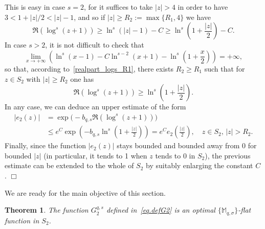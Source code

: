 \documentclass[11pt,a4paper]{article}
\theoremstyle{plain}
\newtheorem{theo}{Theorem}[section]
\theoremstyle{definition}
\newenvironment{proof1}{\medskip\par\noindent{\bf Proof.}}{\hfill $\Box$
\medskip\par}
\def\Ms{{\mathbb{M}}_{q,\sigma}}
\begin{document}
\begin{proof1}
This is easy in case $s=2$, for it suffices to take $|z|>4$ in order to have $3<1+|z|/2<|z|-1$, and so if $|z|\ge R_2:=\max\{R_1,4\}$ we have
$$
\Re(\log^s(z+1))\geq \ln^s(|z|-1)-C\ge \ln^s\left(1+\frac{|z|}{2}\right)-C.
$$
In case $s>2$, it is not difficult to check that
$$
\lim_{x\to+\infty}\left(\ln^s(x-1)-C\ln^{s-2}(x+1)- \ln^s\left(1+\frac{x}{2}\right)\right)=+\infty,
$$
so that, according to~\eqref{realpart_logs_R1}, there exists $R_2\ge R_1$ such that for $z\in S_2$ with $|z|\ge R_2$ one has
\begin{equation*}
\Re(\log^s(z+1))\geq \ln^s\left(1+\frac{|z|}{2}\right).
\end{equation*}
In any case, we can deduce an upper estimate of the form
\begin{align*}
|e_2(z)|&=\exp\big(-b_{q,s}\Re(\log^s(z+1))\big)\\
&\leq  e^C\exp\left(-b_{q,s}\ln^s\left(1+\frac{|z|}{2}\right)\right)= e^Ce_2\left(\frac{|z|}{2}\right), \quad z\in S_2,\,|z|> R_2.
\end{align*}
Finally, since the function $|e_2(z)|$ stays bounded and bounded away from 0 for bounded $|z|$ (in particular, it tends to 1 when $z$ tends to 0 in $S_2$), the previous estimate can be extended to the whole of $S_2$ by suitably enlarging the constant $C$.
\end{proof1}

We are ready for the main objective of this section.

\begin{theo}\label{teor.FlatFunctionS2}
The function $G_2^{q,s}$ defined in~\eqref{eq.defG2} is an optimal $\{\Ms\}$-flat function in $S_2$.
\end{theo}
\end{document}
